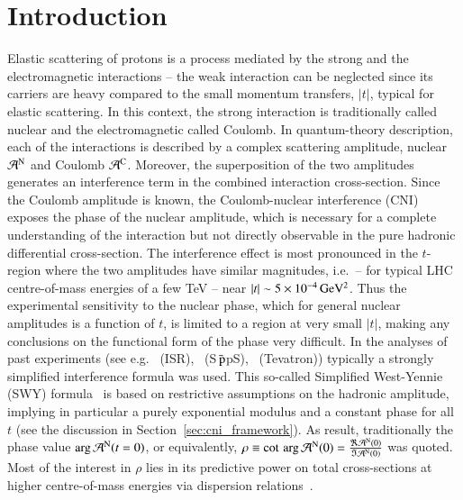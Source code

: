 \section{Introduction}
\label{sec:introduction}

Elastic scattering of protons is a process mediated by the strong and the electromagnetic interactions -- the weak interaction can be neglected since its carriers are heavy compared to the small momentum transfers, $|t|$, typical for elastic scattering. In this context, the strong interaction is traditionally called nuclear and the electromagnetic called Coulomb. In quantum-theory description, each of the interactions is described by a complex scattering amplitude, nuclear ${\cal A}^{\rm N}$ and Coulomb ${\cal A}^{\rm C}$. Moreover, the superposition 
of the two amplitudes generates an interference term in the combined interaction cross-section. 
Since the Coulomb amplitude is known, the Coulomb-nuclear interference (CNI) exposes the phase of the nuclear amplitude, which is necessary for a complete understanding of the interaction but not directly observable in the pure hadronic differential cross-section. The interference effect is most pronounced in the $t$-region where the two amplitudes have similar magnitudes, i.e.~-- for typical LHC centre-of-mass energies of a few TeV -- near $|t| \sim 5 \times 10^{-4}\,\rm GeV^{2}$. Thus the experimental sensitivity to 
the nuclear phase, which for general nuclear amplitudes is a function of $t$, 
is limited to a region at very small $|t|$, making any conclusions on the 
functional form of the phase very difficult.
In the analyses of past experiments (see e.g.~\cite{plb43,plb66,npb141,prl47,plb115,plb120,plb128,npb262} 
(ISR),~\cite{plb198,plb316} (S$\bar{\,{\rm p}}$pS),~\cite{prl68} (Tevatron)) 
typically a strongly simplified interference formula was used. This so-called
Simplified West-Yennie (SWY) formula~\cite{wy68} is based on restrictive assumptions on the 
hadronic amplitude, implying in particular a purely exponential modulus and a 
constant phase for all $t$ (see the discussion in 
Section~\ref{sec:cni_framework}).
As result, traditionally the phase value $\arg {\cal A}^{\rm N} (t=0)$, or
equivalently, $\rho \equiv \cot \, \arg {\cal A}^{\rm N} (0) = \frac{\Re {\cal A}^{\rm N} (0)}{\Im {\cal A}^{\rm N} (0)}$ was quoted. 
Most of the interest in $\rho$ lies in its predictive power on total cross-sections at higher centre-of-mass energies via dispersion 
relations~\cite{dremin-dispersion}. 

